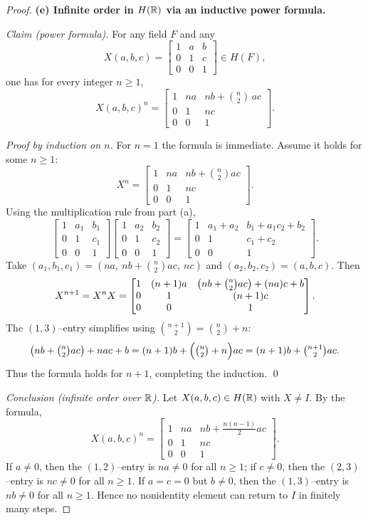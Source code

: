\documentclass[12pt]{article}
\theoremstyle{definition}
\begin{document}
\begin{proof}
\smallskip
\textbf{(e) Infinite order in $H(\Bbb R)$ via an inductive power formula.}

\emph{Claim (power formula).} For any field $F$ and any
\[
X(a,b,c)=\begin{bmatrix}1&a&b\\[2pt]0&1&c\\[2pt]0&0&1\end{bmatrix}\in H(F),
\]
one has for every integer $n\ge 1$,
\[
X(a,b,c)^n=
\begin{bmatrix}
1 & n a & n b + \binom{n}{2}\,a c\\[2pt]
0 & 1 & n c\\[2pt]
0 & 0 & 1
\end{bmatrix}.
\]

\emph{Proof by induction on $n$.}
For $n=1$ the formula is immediate.
Assume it holds for some $n\ge1$:
\[
X^n=\begin{bmatrix}
1 & n a & n b + \binom{n}{2} a c\\
0 & 1 & n c\\
0 & 0 & 1
\end{bmatrix}.
\]
Using the multiplication rule from part (a),
\[
\begin{bmatrix}1&a_1&b_1\\ 0&1&c_1\\ 0&0&1\end{bmatrix}
\begin{bmatrix}1&a_2&b_2\\ 0&1&c_2\\ 0&0&1\end{bmatrix}
=
\begin{bmatrix}1& a_1+a_2 & b_1 + a_1 c_2 + b_2\\ 0&1& c_1+c_2\\ 0&0&1\end{bmatrix}.
\]
Take $(a_1,b_1,c_1)=(n a,\ n b+\binom{n}{2}ac,\ n c)$ and $(a_2,b_2,c_2)=(a,b,c)$.
Then
\[
X^{n+1}=X^n X=\begin{bmatrix}
1 & (n+1)a & \bigl(n b+\tbinom{n}{2}ac\bigr) + (n a)c + b\\
0 & 1 & (n+1)c\\
0 & 0 & 1
\end{bmatrix}.
\]
The $(1,3)$–entry simplifies using $\binom{n+1}{2}=\binom{n}{2}+n$:
\[
\bigl(n b+\tbinom{n}{2}ac\bigr) + n a c + b
= (n+1)b + \Bigl(\tbinom{n}{2}+n\Bigr) a c
= (n+1)b + \tbinom{n+1}{2} a c.
\]
Thus the formula holds for $n+1$, completing the induction. \qed

\medskip
\emph{Conclusion (infinite order over $\Bbb R$).}
Let $X(a,b,c)\in H(\Bbb R)$ with $X\ne I$. By the formula,
\[
X(a,b,c)^n=
\begin{bmatrix}
1 & n a & n b + \tfrac{n(n-1)}{2} a c\\
0 & 1 & n c\\
0 & 0 & 1
\end{bmatrix}.
\]
If $a\ne 0$, then the $(1,2)$–entry is $n a\neq 0$ for all $n\ge1$; if $c\ne 0$, then the $(2,3)$–entry is $n c\neq 0$ for all $n\ge1$.
If $a=c=0$ but $b\ne 0$, then the $(1,3)$–entry is $n b\neq 0$ for all $n\ge1$.
Hence no nonidentity element can return to $I$ in finitely many steps.


\end{proof}
\end{document}
